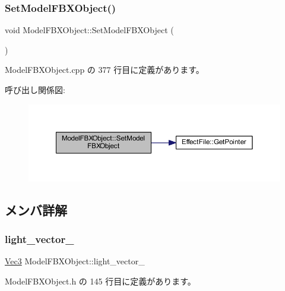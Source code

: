 \subsubsection{\texorpdfstring{Set\+Model\+F\+B\+X\+Object()}{SetModelFBXObject()}}
{\footnotesize\ttfamily void Model\+F\+B\+X\+Object\+::\+Set\+Model\+F\+B\+X\+Object (\begin{DoxyParamCaption}{ }\end{DoxyParamCaption})}



 Model\+F\+B\+X\+Object.\+cpp の 377 行目に定義があります。

呼び出し関係図\+:
\nopagebreak
\begin{figure}[H]
\begin{center}
\leavevmode
\includegraphics[width=350pt]{class_model_f_b_x_object_a3c101cf65da1bdb55b7a11e71cefcad0_cgraph}
\end{center}
\end{figure}


\subsection{メンバ詳解}
\mbox{\label{class_model_f_b_x_object_a9d7b849ac816b7e5841d54a4b75216a9}} 
\subsubsection{\texorpdfstring{light\+\_\+vector\+\_\+}{light\_vector\_}}
{\footnotesize\ttfamily \mbox{\hyperlink{_vector3_d_8h_ab16f59e4393f29a01ec8b9bbbabbe65d}{Vec3}} Model\+F\+B\+X\+Object\+::light\+\_\+vector\+\_\+}



 Model\+F\+B\+X\+Object.\+h の 145 行目に定義があります。

\mbox{\label{class_model_f_b_x_object_a3e2d4d9bd6d754a18f3e1bf713ff5012}} 
